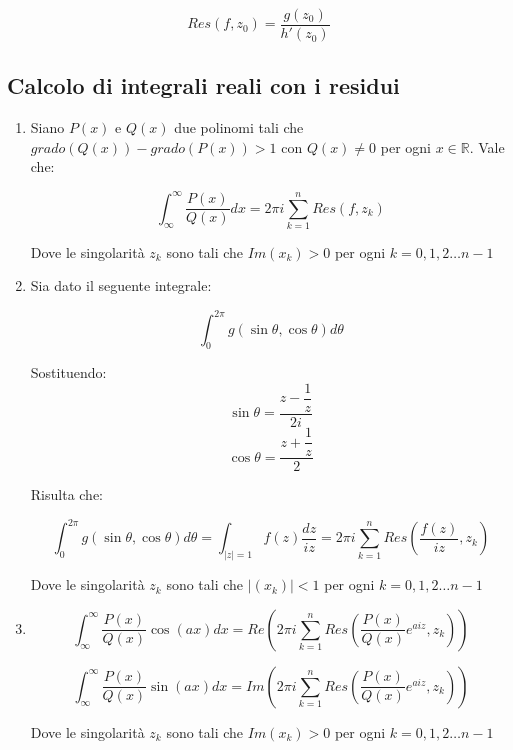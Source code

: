 \documentclass[10pt,a4paper]{article}
\begin{document}
\begin{equation}
Res(f, z_{0}) = \dfrac{g(z_0)}{h'(z_0)}
\end{equation}



\subsection{Calcolo di integrali reali con i residui}

\begin{enumerate}
\item Siano $P(x)$ e $Q(x)$ due polinomi tali che $grado(Q(x)) - grado(P(x)) > 1$ con $Q(x)\neq 0$ per ogni $x \in \mathbb{R}$. Vale che:

\begin{equation}
\int_{\infty}^{\infty} \dfrac{P(x)}{Q(x)}dx = 2\pi i \sum_{k = 1}^{n} Res(f, z_{k})
\end{equation}

Dove le singolarità $z_k$ sono tali che $Im(x_k)>0$ per ogni $k = 0,1,2 \dotsc n-1$

\item Sia dato il seguente integrale:

\begin{equation}
\int_{0}^{2\pi} g(\sin \theta, \cos \theta)d\theta
\end{equation}

Sostituendo:
\[\sin \theta = \dfrac{z - \dfrac{1}{z}}{2i}\]
\[\cos \theta = \dfrac{z + \dfrac{1}{z}}{2}\]

Risulta che:

\begin{equation}
\int_{0}^{2\pi} g(\sin \theta, \cos \theta)d\theta = \int_{|z|=1} f(z) \dfrac{dz}{iz} = 2\pi i \sum_{k = 1}^{n} Res \left( \dfrac{f(z)}{iz}, z_{k} \right)
\end{equation}

Dove le singolarità $z_k$ sono tali che $|(x_k)|<1$ per ogni $k = 0,1,2 \dotsc n-1$


\item 

\begin{equation}
\int_{\infty}^{\infty} \dfrac{P(x)}{Q(x)} \cos(ax)dx = Re \left( 2\pi i \sum_{k = 1}^{n} Res \left( \dfrac{P(x)}{Q(x)}e^{aiz}, z_{k} \right) \right)
\end{equation}

\begin{equation}
\int_{\infty}^{\infty} \dfrac{P(x)}{Q(x)} \sin(ax)dx = Im \left( 2\pi i \sum_{k = 1}^{n} Res \left( \dfrac{P(x)}{Q(x)}e^{aiz}, z_{k} \right) \right)
\end{equation}

Dove le singolarità $z_k$ sono tali che $Im(x_k)>0$ per ogni $k = 0,1,2 \dotsc n-1$

\end{enumerate}
\end{document}
